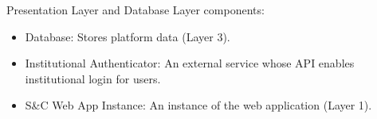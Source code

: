 Presentation Layer and Database Layer components:
\begin{itemize} 
    \item Database: Stores platform data (Layer 3).
    \item Institutional Authenticator: An external service whose API enables institutional login for users.
    \item S\&C Web App Instance: An instance of the web application (Layer 1).
\end{itemize}

